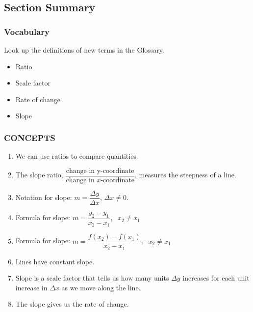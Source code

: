 \documentclass[10pt,]{book}
\theoremstyle{plain}
\theoremstyle{definition}
\theoremstyle{definition}
\theoremstyle{definition}
\theoremstyle{definition}
\numberwithin{equation}{part}
\begin{document}
\typeout{************************************************}
\typeout{************************************************}
\subsection[{Section Summary}]{Section Summary}\label{summary-1-4}
\typeout{************************************************}
\typeout{************************************************}
\subsubsection[{Vocabulary}]{Vocabulary}\label{subsubsection-13}
Look up the definitions of new terms in the Glossary. \leavevmode%
\begin{multicols}{4}
\begin{itemize}[label=\textbullet]
\item{}Ratio%
\item{}Scale factor%
\item{}Rate of change%
\item{}Slope%
\end{itemize}
\end{multicols}
%
\typeout{************************************************}
\typeout{************************************************}
\subsubsection[{CONCEPTS}]{CONCEPTS}\label{subsubsection-14}
\leavevmode%
\begin{enumerate}[label=\arabic*]
\item\hypertarget{li-913}{}We can use ratios to compare quantities.%
\item\hypertarget{li-914}{}The slope ratio, \(\dfrac{\text{change in y-coordinate}}{\text{change in }x\text{-coordinate}}\), measures the steepness of a line.%
\item\hypertarget{li-915}{}Notation for slope: \(m = \dfrac{\Delta y}{\Delta x}\), \(\Delta x \ne 0\).%
\item\hypertarget{li-916}{}Formula for slope: \(m =\dfrac{y_2 - y_1}{x_2 - x_1}\), \(~~x_2\ne x_1 \)%
\item\hypertarget{li-917}{}Formula for slope: \(m =\dfrac{f(x_2) - f(x_1)}{x_2 - x_1}\), \(~~x_2\ne x_1 \)%
\item\hypertarget{li-918}{}Lines have constant slope.%
\item\hypertarget{li-919}{}Slope is a scale factor that tells us how many units \(\Delta y\) increases for each unit increase in \(\Delta x\) as we move along the line.%
\item\hypertarget{li-920}{}The slope gives us the rate of change.%
\end{enumerate}
%
\typeout{************************************************}
\typeout{************************************************}
\end{document}
